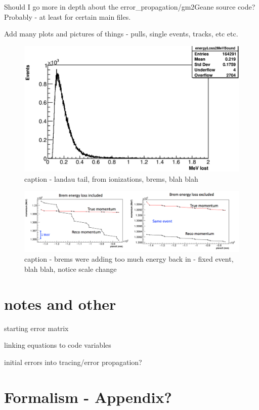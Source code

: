 \documentclass{article}
\begin{document}
Should I go more in depth about the error\_propagation/gm2Geane source code? Probably - at least for certain main files.


Add many plots and pictures of things - pulls, single events, tracks, etc etc.

\begin{figure}[h]
\caption{caption - landau tail, from ionizations, brems, blah blah}
\centering
\includegraphics[width=1.0\textwidth]{eLoss}
\end{figure}

\begin{figure}[h]
\caption{caption - brems were adding too much energy back in - fixed event, blah blah, notice scale change}
\centering
\includegraphics[width=1.0\textwidth]{bremComparison}
\end{figure}


\section{notes and other}

  starting error matrix

  linking equations to code variables

  initial errors into tracing/error propagation?


\section{Formalism - Appendix? }
\end{document}
